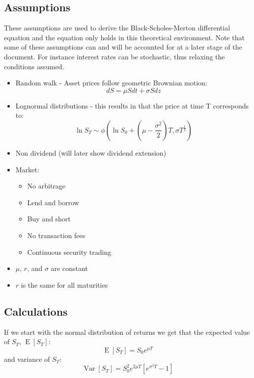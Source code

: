 \documentclass{article}
\DeclareMathOperator{\Var}{Var}
\DeclareMathOperator{\E}{E}
\begin{document}
\subsection{Assumptions}
These assumptions are used to derive the Black-Scholes-Merton \cite{hull} differential equation and the equation only holds in this theoretical environment. Note that some of these assumptions can and will be accounted for at a later stage of the document. For instance interest rates can be stochastic, thus relaxing the conditions assumed.
\begin{itemize}
    \item Random walk - Asset prices follow geometric Brownian motion: 
    \begin{equation*}
        dS = \mu S dt + \sigma S dz
    \end{equation*}
    \item Lognormal distributions - this results in that the price at time T corresponds to: 
    \begin{equation} \label{eq:19}
        \ln S_{T} \sim \phi\left(\ln S_{0} + \left(\mu - \frac{\sigma^{2}}{2}\right)T, \sigma T^{\frac{1}{2}}\right)
    \end{equation}
    \item Non dividend (will later show dividend extension)
    \item Market:
    \begin{itemize}
        \item No arbitrage
        \item Lend and borrow
        \item Buy and short
        \item No transaction fees
        \item Continuous security trading
    \end{itemize}
    \item $\mu$, $r$, and $\sigma$ are constant
    \item $r$ is the same for all maturities
\end{itemize}
\subsection{Calculations}
If we start with the normal distribution of returns we get that the expected value of $S_{T}$, $\E[S_{T}]$: 
\begin{equation*}
    \E[S_{T}] = S_{0} e^{\mu T}
\end{equation*}
and variance of $S_{T}$:
\begin{equation*}
    \Var[S_{T}] = S_{0}^{2} e^{2\mu T}[e^{\sigma^{2}T}-1]
\end{equation*}
\end{document}

